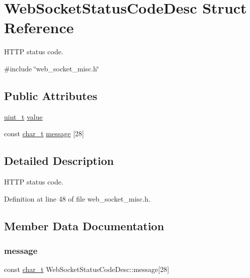\hypertarget{structWebSocketStatusCodeDesc}{}\section{Web\+Socket\+Status\+Code\+Desc Struct Reference}
\label{structWebSocketStatusCodeDesc}


H\+T\+TP status code.  




{\ttfamily \#include \char`\"{}web\+\_\+socket\+\_\+misc.\+h\char`\"{}}

\subsection*{Public Attributes}
\begin{DoxyCompactItemize}
\item 
\hyperlink{compiler__port_8h_a12a1e9b3ce141648783a82445d02b58d}{uint\+\_\+t} \hyperlink{structWebSocketStatusCodeDesc_a36b5c876c9394b0d5034e9bac778c391}{value}
\item 
const \hyperlink{compiler__port_8h_a40bb5262bf908c328fbcfbe5d29d0201}{char\+\_\+t} \hyperlink{structWebSocketStatusCodeDesc_aefbace040c89e7525f8f48732bb6ac9d}{message} \mbox{[}28\mbox{]}
\end{DoxyCompactItemize}


\subsection{Detailed Description}
H\+T\+TP status code. 

Definition at line 48 of file web\+\_\+socket\+\_\+misc.\+h.



\subsection{Member Data Documentation}
\mbox{\label{structWebSocketStatusCodeDesc_aefbace040c89e7525f8f48732bb6ac9d}} 
\subsubsection{\texorpdfstring{message}{message}}
{\footnotesize\ttfamily const \hyperlink{compiler__port_8h_a40bb5262bf908c328fbcfbe5d29d0201}{char\+\_\+t} Web\+Socket\+Status\+Code\+Desc\+::message\mbox{[}28\mbox{]}}



